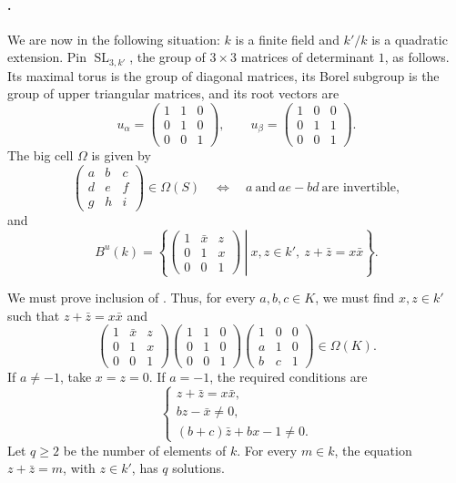 \paragraph{.}
We are now in the following situation: \(k\) is a finite field and
\(k'/k\) is a quadratic extension.  Pin
\(\operatorname{SL}_{3,k'}\), the group of \(3\times3\) matrices of
determinant \(1\), as follows.  Its maximal torus is the group of
diagonal matrices, its Borel subgroup is the group of upper triangular
matrices, and its root vectors are
\[
 u_\alpha=
 \begin{pmatrix}1&1&0\\0&1&0\\0&0&1\end{pmatrix},
 \qquad
 u_\beta=
 \begin{pmatrix}1&0&0\\0&1&1\\0&0&1\end{pmatrix}.
\]
The big cell \(\Omega\) is given by
\[
 \begin{pmatrix}a&b&c\\d&e&f\\g&h&i\end{pmatrix}
 \in\Omega(S)
 \quad\Longleftrightarrow\quad
 a\ \text{and}\ ae-bd\ \text{are invertible},
\]
and
\[
 B^u(k)=
 \left\{
 \left.
 \begin{pmatrix}1&\bar x&z\\0&1&x\\0&0&1\end{pmatrix}
 \ \right|\
 x,z\in k',\ z+\bar z=x\bar x
 \right\}.
\]

We must prove inclusion \textup{} of .  Thus, for every
\(a,b,c\in K\), we must find \(x,z\in k'\) such that
\(z+\bar z=x\bar x\) and
\[
 \begin{pmatrix}1&\bar x&z\\0&1&x\\0&0&1\end{pmatrix}
 \begin{pmatrix}1&1&0\\0&1&0\\0&0&1\end{pmatrix}
 \begin{pmatrix}1&0&0\\a&1&0\\b&c&1\end{pmatrix}
 \in\Omega(K).                                         \tag{3}\label{sga3:xxvi:theorem:5-1:equation:3}
\]
If \(a\ne-1\), take \(x=z=0\).  If \(a=-1\), the required conditions
are
\[
 \begin{cases}
 z+\bar z=x\bar x,\\
 bz-\bar x\ne0,\\
 (b+c)\bar z+bx-1\ne0.
 \end{cases}                                           \tag{4}\label{sga3:xxvi:theorem:5-1:equation:4}
\]
Let \(q\geq2\) be the number of elements of \(k\).  For every
\(m\in k\), the equation \(z+\bar z=m\), with \(z\in k'\), has
\(q\) solutions.


